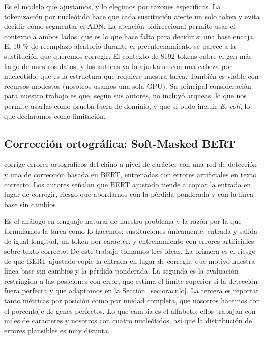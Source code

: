 \documentclass[sigconf,nonacm]{acmart}
\begin{document}
Es el modelo que ajustamos, y lo elegimos por razones específicas. La tokenización por nucleótido hace que cada sustitución afecte un solo token y evita decidir cómo segmentar el ADN. La atención bidireccional permite usar el contexto a ambos lados, que es lo que hace falta para decidir si una base encaja. El 10 \% de reemplazo aleatorio durante el preentrenamiento se parece a la sustitución que queremos corregir. El contexto de 8192 tokens cubre el gen más largo de nuestros datos, y los autores ya lo ajustaron con una cabeza por nucleótido, que es la estructura que requiere nuestra tarea. También es viable con recursos modestos (nosotros usamos una sola GPU). Su principal consideración para nuestro trabajo es que, según sus autores, no incluyó arqueas, lo que nos permite usarlas como prueba fuera de dominio, y que sí pudo incluir \emph{E. coli}, lo que declaramos como limitación.

\subsection{\texorpdfstring{Corrección ortográfica: Soft-Masked BERT~\cite{zhang2020spelling}}{Corrección ortográfica: Soft-Masked BERT}}

corrige errores ortográficos del chino a nivel de carácter con una red de detección y una de corrección basada en BERT, entrenadas con errores artificiales en texto correcto. Los autores señalan que BERT ajustado tiende a copiar la entrada en lugar de corregir, riesgo que abordamos con la pérdida ponderada y con la línea base sin cambios

Es el análogo en lenguaje natural de nuestro problema y la razón por la que formulamos la tarea como lo hacemos: sustituciones únicamente, entrada y salida de igual longitud, un token por carácter, y entrenamiento con errores artificiales sobre texto correcto. De este trabajo tomamos tres ideas. La primera es el riesgo de que BERT ajustado copie la entrada en lugar de corregir, que motivó nuestra línea base sin cambios y la pérdida ponderada. La segunda es la evaluación restringida a las posiciones con error, que estima el límite superior si la detección fuera perfecta y que adaptamos en la Sección~\ref{sec:oraculo}. La tercera es reportar tanto métricas por posición como por unidad completa, que nosotros hacemos con el porcentaje de genes perfectos. Lo que cambia es el alfabeto: ellos trabajan con miles de caracteres y nosotros con cuatro nucleótidos, así que la distribución de errores plausibles es muy distinta.
\end{document}
